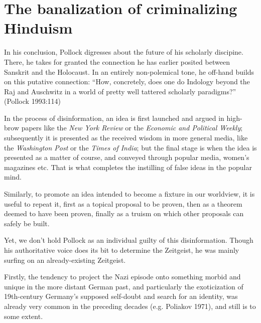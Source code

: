 \section*{The banalization of criminalizing Hinduism}

In his conclusion, Pollock digresses about the future of his scholarly discipine. There, he takes for granted the connection he has earlier posited between Sanskrit and the Holocaust. In an entirely non-polemical tone, he off-hand builds on this putative connection: “How, concretely, does one do Indology beyond the Raj and Auschwitz in a world of pretty well tattered scholarly paradigms?” (Pollock 1993:114) 

In the process of disinformation, an idea is first launched and argued in high-brow papers like the {\sl New York Review} or the {\sl Economic and Political Weekly}; subsequently it is presented as the received wisdom in more general media, like the {\sl Washington Post} or the {\sl Times of India}; but the final stage is when the idea is presented as a matter of course, and conveyed through popular media, women’s magazines etc. That is what completes the instilling of false ideas in the popular mind.

Similarly, to promote an idea intended to become a fixture in our worldview, it is useful to repeat it, first as a topical proposal to be proven, then as a theorem deemed to have been proven, finally as a truism on which other proposals can safely be built.

Yet, we don’t hold Pollock as an individual guilty of this disinformation. Though his authoritative voice does its bit to determine the Zeitgeist, he was mainly surfing on an already-existing Zeitgeist.

Firstly, the tendency to project the Nazi episode onto something morbid and unique in the more distant German past, and particularly the exoticization of 19th-century Germany’s supposed self-doubt and search for an identity, was already very common in the preceding decades (e.g. Poliakov 1971), and still is to some extent.

